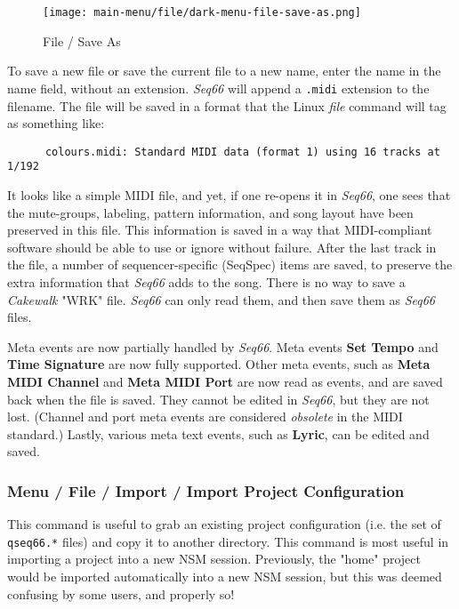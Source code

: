 \begin{figure}[H]
   \centering 
   \texttt{[image: main-menu/file/dark-menu-file-save-as.png]}
   \caption{File / Save As}
   \label{fig:menu_file_save_as}
\end{figure}

   To save a new file or save the current file to a new name,
   enter the name in the name field, without an extension.
   \textsl{Seq66} will append a \texttt{.midi} extension to the filename.
   The file will be saved in a format that the Linux \textsl{file} command
   will tag as something like:

   \begin{verbatim}
      colours.midi: Standard MIDI data (format 1) using 16 tracks at 1/192
   \end{verbatim}

   It looks like a simple MIDI file, and yet, if one re-opens it in
   \textsl{Seq66}, one sees that the mute-groups, labeling, pattern
   information, and song layout have been preserved in this file.
   This information is saved in a way that MIDI-compliant software
   should be able to use or ignore without failure.
   After the last track in the file, a number of
   sequencer-specific (SeqSpec) items are saved, to preserve
   the extra information that \textsl{Seq66} adds to the song.
   There is no way to save a \textsl{Cakewalk} "WRK" file.
   \textsl{Seq66} can only read them, and then save them as
   \textsl{Seq66} files.

   Meta events are now partially handled by \textsl{Seq66}.
   Meta events \textbf{Set Tempo}
   and \textbf{Time Signature}
   are now fully supported.
   Other meta events,
   such as \textbf{Meta MIDI Channel}
   and \textbf{Meta MIDI Port}
   are now read as events, and are saved back when the file is saved.
   They cannot be edited in \textsl{Seq66}, but they are not lost.
   (Channel and port meta events are
   considered \textsl{obsolete} in the MIDI standard.)
   Lastly, various meta text events, such as \textbf{Lyric},
   can be edited and saved.

\subsubsection{Menu / File / Import / Import Project Configuration}
\label{subsubsec:menu_file_import_project_configuration}

   This command is useful to grab an existing project configuration
   (i.e. the set of \texttt{qseq66.*} files) and copy it
   to another directory.
   This command is most useful in importing a project into a new
   NSM session.  Previously, the "home" project would be imported automatically
   into a new NSM session, but this was deemed confusing by some users, and
   properly so!


